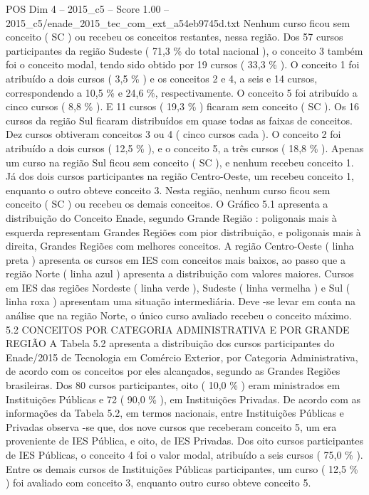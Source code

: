 \begin{textsample}{POS Dim 4 – 2015\_c5 – Score 1.00 – 2015\_c5/enade\_2015\_tec\_com\_ext\_a54eb9745d.txt}
Nenhum curso ficou sem conceito ( SC ) ou recebeu os conceitos restantes, nessa região.
Dos 57 cursos participantes da região Sudeste ( 71,3 \% do total nacional ), o conceito 3 também foi o conceito modal, tendo sido obtido por 19 cursos ( 33,3 \% ).
O conceito 1 foi atribuído a dois cursos ( 3,5 \% ) e os conceitos 2 e 4, a seis e 14 cursos, correspondendo a 10,5 \% e 24,6 \%, respectivamente.
O conceito 5 foi atribuído a cinco cursos ( 8,8 \% ).
E 11 cursos ( 19,3 \% ) ficaram sem conceito ( SC ).
Os 16 cursos da região Sul ficaram distribuídos em quase todas as faixas de conceitos.
Dez cursos obtiveram conceitos 3 ou 4 ( cinco cursos cada ).
O conceito 2 foi atribuído a dois cursos ( 12,5 \% ), e o conceito 5, a três cursos ( 18,8 \% ).
Apenas um curso na região Sul ficou sem conceito ( SC ), e nenhum recebeu conceito 1.
Já dos dois cursos participantes na região Centro-Oeste, um recebeu conceito 1, enquanto o outro obteve conceito 3.
Nesta região, nenhum curso ficou sem conceito ( SC ) ou recebeu os demais conceitos.
O Gráfico 5.1 apresenta a distribuição do Conceito Enade, segundo Grande Região : poligonais mais à esquerda representam Grandes Regiões com pior distribuição, e poligonais mais à direita, Grandes Regiões com melhores conceitos.
A região Centro-Oeste ( linha preta ) apresenta os cursos em IES com conceitos mais baixos, ao passo que a região Norte ( linha azul ) apresenta a distribuição com valores maiores.
Cursos em IES das regiões Nordeste ( linha verde ), Sudeste ( linha vermelha ) e Sul ( linha roxa ) apresentam uma situação intermediária.
Deve -se levar em conta na análise que na região Norte, o único curso avaliado recebeu o conceito máximo. 5.2 CONCEITOS POR CATEGORIA ADMINISTRATIVA E POR GRANDE REGIÃO A Tabela 5.2 apresenta a distribuição dos cursos participantes do Enade/2015 de Tecnologia em Comércio Exterior, por Categoria Administrativa, de acordo com os conceitos por eles alcançados, segundo as Grandes Regiões brasileiras.
Dos 80 cursos participantes, oito ( 10,0 \% ) eram ministrados em Instituições Públicas e 72 ( 90,0 \% ), em Instituições Privadas.
De acordo com as informações da Tabela 5.2, em termos nacionais, entre Instituições Públicas e Privadas observa -se que, dos nove cursos que receberam conceito 5, um era proveniente de IES Pública, e oito, de IES Privadas.
Dos oito cursos participantes de IES Públicas, o conceito 4 foi o valor modal, atribuído a seis cursos ( 75,0 \% ).
Entre os demais cursos de Instituições Públicas participantes, um curso ( 12,5 \% ) foi avaliado com conceito 3, enquanto outro curso obteve conceito 5.

\end{textsample}
